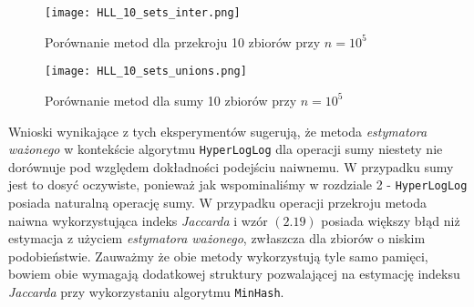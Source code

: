 \begin{figure}[h!]
    \texttt{[image: HLL\_10\_sets\_inter.png]}
    \centering
    \caption{Porównanie metod dla przekroju 10 zbiorów przy $n=10^5$}
    \label{fig:HLL_10_sets_inter}
\end{figure}

\begin{figure}[h!]
    \texttt{[image: HLL\_10\_sets\_unions.png]}
    \centering
    \caption{Porównanie metod dla sumy 10 zbiorów przy $n=10^5$}
    \label{fig:HLL_10_sets_unions}
\end{figure}

Wnioski wynikające z tych eksperymentów sugerują, że metoda \textit{estymatora ważonego} w kontekście algorytmu \texttt{HyperLogLog} dla operacji sumy niestety nie dorównuje pod względem dokładności podejściu naiwnemu. W przypadku sumy jest to dosyć oczywiste, ponieważ jak wspominaliśmy w rozdziale 2 - \texttt{HyperLogLog} posiada naturalną operację sumy. W przypadku operacji przekroju metoda naiwna wykorzystująca indeks \textit{Jaccarda} i wzór $(2.19)$ posiada większy błąd niż estymacja z użyciem \textit{estymatora ważonego}, zwłaszcza dla zbiorów o niskim podobieństwie. Zauważmy że obie metody wykorzystują tyle samo pamięci, bowiem obie wymagają dodatkowej struktury pozwalającej na estymację indeksu \textit{Jaccarda} przy wykorzystaniu algorytmu \texttt{MinHash}.